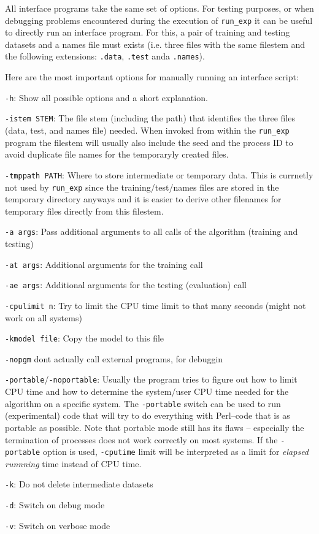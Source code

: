 \documentclass[a4paper,10pt,twoside]{article}
\newenvironment{optionlist}
{\begin{list}{}
    {\setlength{\itemsep}{0em plus0em minus0ex}
      \setlength{\parsep}{0ex}
      \setlength{\topsep}{0em}
      \setlength{\leftmargin}{2em}
      \setlength{\listparindent}{0em}
      \setlength{\itemindent}{-2em}
      \setlength{\partopsep}{0ex}
    }}
  {\end{list}}
\begin{document}
All interface programs take the same set of options. For testing 
purposes, or when debugging problems encountered during the execution
of \verb=run_exp= it can be useful to directly run an interface program.
For this, a pair of training and testing datasets and a names file must
exists (i.e. three files with the same filestem and the following extensions:
 \verb=.data=,  \verb=.test= anda \verb=.names=).

Here are the most important options for manually running an interface 
script:

\begin{optionlist}
\item \verb=-h=: Show all possible options and a short explanation. 
\item \verb=-istem STEM=: The file stem (including the path) that 
  identifies the three files (data, test, and names file) needed.
  When invoked from within the \verb=run_exp= program the filestem
  will usually also include the seed and the process ID to avoid
  duplicate file names for the temporaryly created files. 
\item \verb=-tmppath PATH=:  Where to store intermediate or temporary data. This 
  is currnetly not used by \verb=run_exp= since the training/test/names
  files are stored in the temporary directory anyways and it is easier
  to derive other filenames for temporary files directly from this filestem. 
\item \verb=-a args=: Pass additional arguments to all calls of the algorithm
  (training and testing) 
\item \verb=-at args=: Additional arguments for the training call 
\item \verb=-ae args=: Additional arguments for the testing (evaluation) call 
\item \verb=-cpulimit n=:  Try to limit the CPU time limit to that many seconds 
  (might not work on all systems) 
\item \verb=-kmodel file=: Copy the model to this file 
\item \verb=-nopgm= dont actually call external programs, for debuggin 
\item \verb=-portable=/\verb=-noportable=: Usually the program tries to figure out
  how to limit CPU time and how to determine the system/user CPU time
  needed for the algorithm on a specific system. The \verb=-portable=
  switch can be used to run (experimental) code that will try to
  do everything with Perl--code that is as portable as possible.
  Note that portable mode still has its flaws -- especially the 
  termination of processes does not work correctly on most systems.
  If the \verb=-portable= option is used, \verb=-cputime= limit
  will be interpreted as a limit for \emph{elapsed runnning} time 
  instead of CPU time. 
\item \verb=-k=: Do not delete intermediate datasets 
\item \verb=-d=: Switch on debug mode 
\item \verb=-v=:  Switch on verbose mode 
\end{optionlist}
\end{document}
